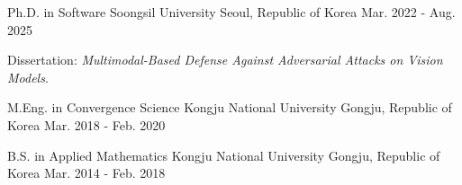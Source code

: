 
\begin{cventries}
  \cventry
    {Ph.D. in Software}
    {Soongsil University}
    {Seoul, Republic of Korea}
    {Mar. 2022 - Aug. 2025}
    {
      \begin{cvitems}
        \item {Dissertation: \textit{Multimodal-Based Defense Against Adversarial Attacks on Vision Models}.}
      \end{cvitems}
    }

  \cventry
    {M.Eng. in Convergence Science}
    {Kongju National University}
    {Gongju, Republic of Korea}
    {Mar. 2018 - Feb. 2020}
    {}

  \cventry
    {B.S. in Applied Mathematics}
    {Kongju National University}
    {Gongju, Republic of Korea}
    {Mar. 2014 - Feb. 2018}
    {}
\end{cventries}
